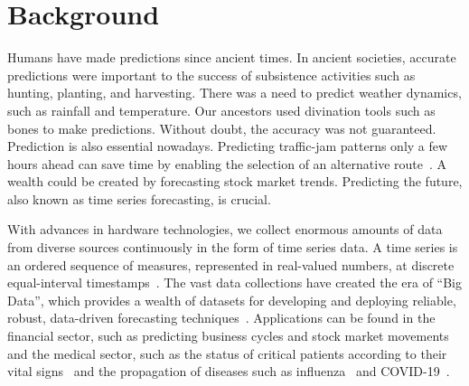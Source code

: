 \section{Background} \label{sec:introduction}

Humans have made predictions since ancient times.
In ancient societies, accurate predictions were important to the success of subsistence activities such as hunting, planting, and harvesting.
There was a need to predict weather dynamics, such as rainfall and temperature.
Our ancestors used divination tools such as bones to make predictions.
%
Without doubt, the accuracy was not guaranteed.
Prediction is also essential nowadays.
Predicting traffic-jam patterns only a few hours ahead can save time by enabling the selection of an alternative route~\cite{lai2018modeling}.
A wealth could be created by forecasting stock market trends.
Predicting the future, also known as time series forecasting, is crucial.

With advances in hardware technologies, we collect enormous amounts of data from diverse sources continuously in the form of time series data.
%
A time series is an ordered sequence of measures, represented in real-valued numbers, at discrete equal-interval timestamps~\cite{chatfield2019analysis}.
%
The vast data collections have created the era of ``Big Data'', which provides a wealth of datasets for developing and deploying reliable, robust, data-driven forecasting techniques~\cite{al-jarrah2015efficient}.
%
Applications can be found in the financial sector, such as predicting business cycles and stock market movements~\cite{li2024deep, lai2018modeling, sapankevych2009time, chen2023long} and the medical sector, such as the status of critical patients according to their vital signs~\cite{torres2021deep, dasilva2021deepsigns} and the propagation of diseases such as influenza~\cite{chen2023long, wu2020deep} and COVID-19~\cite{torres2021deep, martinez-alvarez2020coronavirus}. 

